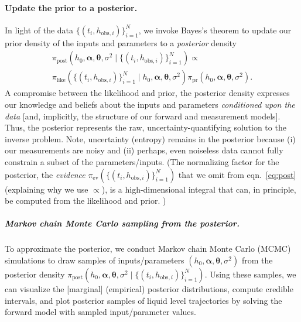 \documentclass[a4paper,fleqn]{cas-dc}
\newcommand\thedata {$\{(t_i,h_{\text{obs}, i})\}_{i=1}^{N}$\xspace}
\newcommand\thedatanomath {\{(t_i,h_{\text{obs}, i})\}_{i=1}^{N}}
\begin{document}
\paragraph{Update the prior to a posterior.}
In light of the data \thedata, we invoke Bayes's theorem  \cite{van2021bayesian,calvetti2018inverse} to update our prior density of the inputs and parameters to a \emph{posterior} density
\begin{multline}
\pi_{\text{post}}(h_0, \boldsymbol \alpha, \boldsymbol \theta, \sigma^2 \mid \thedatanomath) \propto \\ %
	\pi_{\text{like}}(\thedatanomath \mid h_0,  \boldsymbol \alpha, \boldsymbol \theta, \sigma^2 ) 
	\pi_{\text{pr}}(h_0, \boldsymbol\alpha, \boldsymbol \theta, \sigma^2).
	 \label{eq:post}
\end{multline} 
A compromise between the likelihood and prior,
the posterior density expresses our knowledge and beliefs about the inputs and parameters \emph{conditioned upon the data} [and, implicitly, the structure of our forward and measurement models]. 
Thus, the posterior represents the raw, uncertainty-quantifying solution to the inverse problem.
Note, uncertainty (entropy) remains in the posterior because
 (i) our measurements are noisy and 
 (ii) perhaps, even noiseless data cannot fully constrain a subset of the parameters/inputs.
(The normalizing factor for the posterior, the \emph{evidence} $\pi_{\text{ev}}(\thedatanomath)$ that we omit from eqn.~\ref{eq:post} (explaining why we use $\propto$), is a high-dimensional integral that can, in principle, be computed from the likelihood and prior.
)


\subparagraph{Markov chain Monte Carlo sampling from the posterior.}
To approximate the posterior, we conduct Markov chain Monte Carlo (MCMC) simulations \cite{robert1999monte,van2021bayesian} to draw samples of inputs/parameters $(h_0, \boldsymbol \alpha, \boldsymbol \theta, \sigma^2 )$ from the posterior density $\pi_{\text{post}}(h_0, \boldsymbol \alpha, \boldsymbol \theta, \sigma^2 \mid \thedatanomath)$. 
Using these samples, we can visualize the [marginal] (empirical) posterior distributions, compute credible intervals, and plot posterior samples of liquid level trajectories by solving the forward model with sampled input/parameter values.
\end{document}
